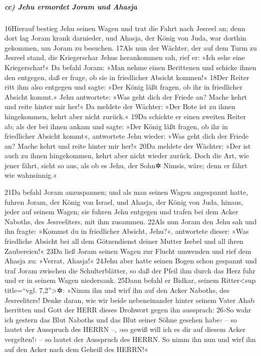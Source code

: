\hypertarget{cc-jehu-ermordet-joram-und-ahasja}{%
\subparagraph{cc) Jehu ermordet Joram und
Ahasja}\label{cc-jehu-ermordet-joram-und-ahasja}}

16Hierauf bestieg Jehu seinen Wagen und trat die Fahrt nach Jesreel an;
denn dort lag Joram krank darnieder, und Ahasja, der König von Juda, war
dorthin gekommen, um Joram zu besuchen. 17Als nun der Wächter, der auf
dem Turm zu Jesreel stand, die Kriegerschar Jehus herankommen sah, rief
er: »Ich sehe eine Kriegerschar!« Da befahl Joram: »Man nehme einen
Berittenen und schicke ihnen den entgegen, daß er frage, ob sie in
friedlicher Absicht kommen!« 18Der Reiter ritt ihm also entgegen und
sagte: »Der König läßt fragen, ob ihr in friedlicher Absicht kommt.«
Jehu antwortete: »Was geht dich der Friede an? Mache kehrt und reite
hinter mir her!« Da meldete der Wächter: »Der Bote ist zu ihnen
hingekommen, kehrt aber nicht zurück.« 19Da schickte er einen zweiten
Reiter ab; als der bei ihnen ankam und sagte: »Der König läßt fragen, ob
ihr in friedlicher Absicht kommt«, antwortete Jehu wieder: »Was geht
dich der Friede an? Mache kehrt und reite hinter mir her!« 20Da meldete
der Wächter: »Der ist auch zu ihnen hingekommen, kehrt aber nicht wieder
zurück. Doch die Art, wie jener fährt, sieht so aus, als ob es Jehu, der
Sohn✲ Nimsis, wäre; denn er fährt wie wahnsinnig.«

21Da befahl Joram anzuspannen; und als man seinen Wagen angespannt
hatte, fuhren Joram, der König von Israel, und Ahasja, der König von
Juda, hinaus, jeder auf seinem Wagen; sie fuhren Jehu entgegen und
trafen bei dem Acker Naboths, des Jesreeliters, mit ihm zusammen. 22Als
nun Joram den Jehu sah und ihn fragte: »Kommst du in friedlicher
Absicht, Jehu?«, antwortete dieser: »Was friedliche Absicht bei all dem
Götzendienst deiner Mutter Isebel und all ihren Zaubereien!« 23Da ließ
Joram seinen Wagen zur Flucht umwenden und rief dem Ahasja zu: »Verrat,
Ahasja!« 24Jehu aber hatte seinen Bogen schon gespannt und traf Joram
zwischen die Schulterblätter, so daß der Pfeil ihm durch das Herz fuhr
und er in seinem Wagen niedersank. 25Dann befahl er Bidkar, seinem
Ritter\textless sup title=``vgl. 7,2''\textgreater✲: »Nimm ihn und wirf
ihn auf den Acker Naboths, des Jesreeliters! Denke daran, wie wir beide
nebeneinander hinter seinem Vater Ahab herritten und Gott der HERR
dieses Drohwort gegen ihn aussprach: 26›So wahr ich gestern das Blut
Naboths und das Blut seiner Söhne gesehen habe‹ -- so lautet der
Ausspruch des HERRN --, ›so gewiß will ich es dir auf diesem Acker
vergelten!‹ -- so lautet der Ausspruch des HERRN. So nimm ihn nun und
wirf ihn auf den Acker nach dem Geheiß des HERRN!«

